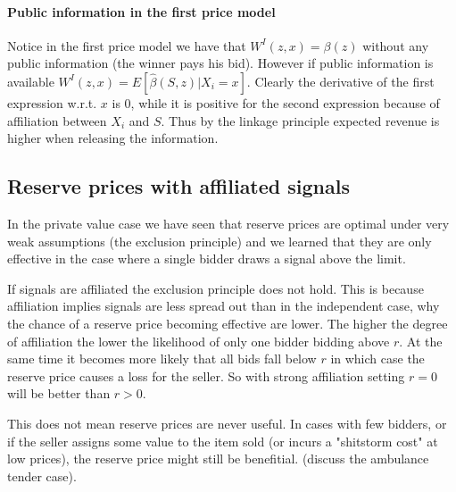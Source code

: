 \paragraph{Public information in the first price model}
Notice in the first price model we have that $W^I(z,x)=\beta(z)$ without any public information (the winner pays his bid). However if public information is available $W^I(z,x) = E[\hat{\beta}(S,z)|X_i = x]$. Clearly the derivative of the first expression w.r.t. $x$ is 0, while it is positive for the second expression because of affiliation between $X_i$ and $S$. Thus by the linkage principle expected revenue is higher when releasing the information.

\subsection{Reserve prices with affiliated signals}
In the private value case we have seen that reserve prices are optimal under very weak assumptions (the exclusion principle) and we learned that they are only effective in the case where a single bidder draws a signal above the limit. 

If signals are affiliated the exclusion principle does not hold. This is because affiliation implies signals are less spread out than in the independent case, why the chance of a reserve price becoming effective are lower. The higher the degree of affiliation the lower the likelihood of only one bidder bidding above $r$. At the same time it becomes more likely that all bids fall below $r$ in which case the reserve price causes a loss for the seller. So with strong affiliation setting $r=0$ will be better than $r>0$.

This does not mean reserve prices are never useful. In cases with few bidders, or if the seller assigns some value to the item sold (or incurs a "shitstorm cost" at low prices), the reserve price might still be benefitial. (discuss the ambulance tender case).

